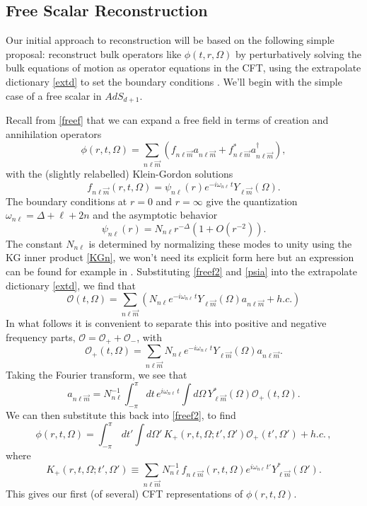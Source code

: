 \documentclass[toc]{PoS}
\newcommand{\be}{\begin{equation}}
\newcommand{\ee}{\end{equation}}
\newcommand{\mO}{\mathcal{O}}
\begin{document}
\subsection{Free Scalar Reconstruction}
Our initial approach to reconstruction will be based on the following simple proposal: reconstruct bulk operators like $\phi(t,r,\Omega)$ by perturbatively solving the bulk equations of motion as operator equations in the CFT, using the extrapolate dictionary \eqref{extd} to set the boundary conditions \cite{Banks:1998dd,Hamilton:2006az,Kabat:2011rz,Kabat:2012hp,Heemskerk:2012mn,Heemskerk:2012np,Kabat:2013wga}. We'll begin with the simple case of a free scalar in $AdS_{d+1}$. 

Recall from \eqref{freef} that we can expand a free field in terms of creation and annihilation operators
\be\label{freef2}
\phi(r,t,\Omega)=\sum_{n\ell \vec{m}}\left(f_{n\ell\vec{m}}a_{n\ell\vec{m}}+f_{n\ell\vec{m}}^*a_{n\ell\vec{m}}^\dagger\right),
\ee
with the (slightly relabelled) Klein-Gordon solutions 
\be
f_{n\ell\vec{m}}(r,t,\Omega)=\psi_{n\ell}(r)e^{-i\omega_{n\ell}\,t}Y_{\ell\vec{m}}(\Omega).
\ee
The boundary conditions at $r=0$ and $r=\infty$ give the quantization $\omega_{n\ell}=\Delta+\ell+2n$ and the asymptotic behavior
\be\label{psia}
\psi_{n\ell}(r)=N_{n\ell}r^{-\Delta}\left(1+O(r^{-2})\right).
\ee
The constant $N_{n\ell}$ is determined by normalizing these modes to unity using the KG inner product \eqref{KGn}, we won't need its explicit form here but an expression can be found for example in \cite{Harlow:2014yka}.  Substituting \eqref{freef2} and \eqref{psia} into the extrapolate dictionary \eqref{extd}, we find that
\be
\mathcal{O}(t,\Omega)=\sum_{n\ell\vec{m}}\left(N_{n\ell}e^{-i\omega_{n\ell}\,t}Y_{\ell \vec{m}}(\Omega)a_{n\ell\vec{m}}+h.c.\right)
\ee
In what follows it is convenient to separate this into positive and negative frequency parts, $\mathcal{O}=\mO_++\mO_-$, with
\be
\mO_+(t,\Omega)=\sum_{n\ell\vec{m}}N_{n\ell}e^{-i\omega_{n\ell}\,t}Y_{\ell \vec{m}}(\Omega)a_{n\ell\vec{m}}.
\ee
Taking the Fourier transform, we see that
\be
a_{n\ell\vec{m}}=N_{n\ell}^{-1}\int_{-\pi}^\pi dt\, e^{i\omega_{n\ell}\,t}\int d\Omega \,Y_{\ell\vec{m}}^*(\Omega)\mO_+(t,\Omega).
\ee
We can then substitute this back into \eqref{freef2}, to find \cite{Banks:1998dd}
\be\label{phir1}
\phi(r,t,\Omega)=\int_{-\pi}^{\pi} \, dt'\int d\Omega'\, K_+(r,t,\Omega;t',\Omega')\mO_+(t',\Omega')+h.c.\,,
\ee
where
\be
K_+(r,t,\Omega;t',\Omega')\equiv\sum_{n\ell\vec{m}}N_{n\ell}^{-1}f_{n\ell\vec{m}}(r,t,\Omega)e^{i\omega_{n\ell}\,t'}Y_{\ell\vec{m}}^*(\Omega').
\ee
This gives our first (of several) CFT representations of $\phi(r,t,\Omega)$. 
\end{document}
